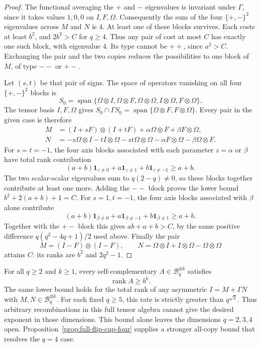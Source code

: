 \begin{proof}
The functional averaging the $+$ and $-$ eigenvalues is invariant
under $\Gamma$, since it takes values $1,0,0$ on $I,F,\Omega$.
Consequently the sum of the four $\{+,-\}^2$ eigenvalues across $M$
and $N$ is $4$. At least one of these blocks survives. Each costs
at least $b^2$, and $2b^2>C$ for $q\ge4$. Thus any pair of cost at
most $C$ has exactly one such block, with eigenvalue $4$.
Its type cannot be $++$, since $a^2>C$.
Exchanging the pair and the two copies reduces the possibilities to
one block of $M$, of type $--$ or $+-$.

Let $(s,t)$ be that pair of signs. The space of operators vanishing
on all four $\{+,-\}^2$ blocks is
\[
 S_0=\operatorname{span}\{
 \Omega\otimes I,\Omega\otimes F,\Omega\otimes\Omega,
 I\otimes\Omega,F\otimes\Omega\}.
\]
The tensor basis $I,F,\Omega$ gives
$S_0\cap\Gamma S_0=\operatorname{span}\{
\Omega\otimes F,F\otimes\Omega\}$.
Every pair in the given case is therefore
\begin{align*}
 M&=(I+sF)\otimes(I+tF)
       +\alpha\Omega\otimes F+\beta F\otimes\Omega,\\
 N&=-s\Omega\otimes I-tI\otimes\Omega-st\Omega\otimes\Omega
       -\alpha F\otimes\Omega-\beta\Omega\otimes F.
\end{align*}
For $s=t=-1$, the four axis blocks associated with each parameter
$z=\alpha$ or $\beta$ have total rank contribution
\[
 (a+b)\mathbf1_{z\ne0}
       +a\mathbf1_{z\ne1}+b\mathbf1_{z\ne-1}\ge a+b.
\]
The two scalar-scalar eigenvalues sum to $q(2-q)\ne0$, so these
blocks together contribute at least one more. Adding the $--$
block proves the lower bound $b^2+2(a+b)+1=C$.
For $s=1,t=-1$, the four axis blocks associated with $\beta$ alone
contribute
\[
 (a+b)\mathbf1_{\beta\ne0}
       +a\mathbf1_{\beta\ne-1}+b\mathbf1_{\beta\ne1}\ge a+b.
\]
Together with the $+-$ block this gives $ab+a+b>C$, by the same
positive difference $q(q^2-4q+1)/2$ used above.
Finally the pair
\[
 M=(I-F)\otimes(I-F),\qquad
 N=\Omega\otimes I+I\otimes\Omega-\Omega\otimes\Omega
\]
attains $C$: its ranks are $b^2$ and $2q^2-1$.
\end{proof}

\begin{proposition}
\label{prop:flip-cup-all-copy}
For all $q\ge2$ and $k\ge1$, every self-complementary
$A\in\mathcal B_q^{\otimes k}$ satisfies
\[
 \operatorname{rank}A\ge b^k.
\]
The same lower bound holds for the total rank of any asymmetric
$I=M+\Gamma N$ with $M,N\in\mathcal B_q^{\otimes k}$.
For each fixed $q\ge5$, this rate is strictly greater than
$q^{\sqrt2}$. Thus arbitrary recombinations in this full tensor
algebra cannot give the desired exponent in those dimensions.
This bound alone leaves the dimensions $q=2,3,4$ open.
Proposition~\ref{prop:full-flip-cup-four} supplies a stronger
all-copy bound that resolves the $q=4$ case.
\end{proposition}

